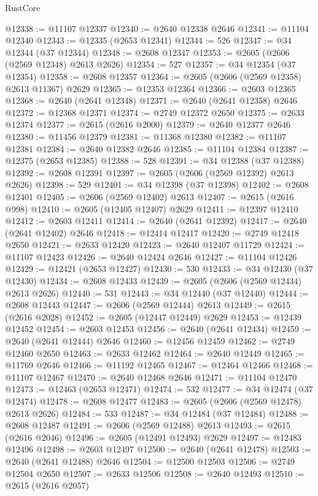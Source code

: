 \begin{lexlean}{RustCore}
\begin{coremodule}
@12338 := @11107 @12337
@12340 := @2640 @12338 @2646
@12341 := @11104 @12340
@12343 := @12335 (@2653 @12341)
@12344 := 526
@12347 := @34 @12344 (@37 @12344)
@12348 := @2608 @12347
@12353 := @2605 (@2606 (@2569 @12348) @2613 @2626)
@12354 := 527
@12357 := @34 @12354 (@37 @12354)
@12358 := @2608 @12357
@12364 := @2605 (@2606 (@2569 @12358) @2613 @11367) @2629
@12365 := @12353 @12364
@12366 := @2603 @12365
@12368 := @2640 (@2641 @12348)
@12371 := @2640 (@2641 @12358) @2646
@12372 := @12368 @12371
@12374 := @2749 @12372 @2650
@12375 := @2633 @12374
@12377 := @2615 (@2616 @2000)
@12379 := @2640 @12377 @2646
@12380 := @11456 @12379
@12381 := @11368 @12380
@12382 := @11107 @12381
@12384 := @2640 @12382 @2646
@12385 := @11104 @12384
@12387 := @12375 (@2653 @12385)
@12388 := 528
@12391 := @34 @12388 (@37 @12388)
@12392 := @2608 @12391
@12397 := @2605 (@2606 (@2569 @12392) @2613 @2626)
@12398 := 529
@12401 := @34 @12398 (@37 @12398)
@12402 := @2608 @12401
@12405 := @2606 (@2569 @12402) @2613
@12407 := @2615 (@2616 @998)
@12410 := @2605 (@12405 @12407) @2629
@12411 := @12397 @12410
@12412 := @2603 @12411
@12414 := @2640 (@2641 @12392)
@12417 := @2640 (@2641 @12402) @2646
@12418 := @12414 @12417
@12420 := @2749 @12418 @2650
@12421 := @2633 @12420
@12423 := @2640 @12407 @11729
@12424 := @11107 @12423
@12426 := @2640 @12424 @2646
@12427 := @11104 @12426
@12429 := @12421 (@2653 @12427)
@12430 := 530
@12433 := @34 @12430 (@37 @12430)
@12434 := @2608 @12433
@12439 := @2605 (@2606 (@2569 @12434) @2613 @2626)
@12440 := 531
@12443 := @34 @12440 (@37 @12440)
@12444 := @2608 @12443
@12447 := @2606 (@2569 @12444) @2613
@12449 := @2615 (@2616 @2028)
@12452 := @2605 (@12447 @12449) @2629
@12453 := @12439 @12452
@12454 := @2603 @12453
@12456 := @2640 (@2641 @12434)
@12459 := @2640 (@2641 @12444) @2646
@12460 := @12456 @12459
@12462 := @2749 @12460 @2650
@12463 := @2633 @12462
@12464 := @2640 @12449
@12465 := @11769 @2646
@12466 := @11192 @12465
@12467 := @12464 @12466
@12468 := @11107 @12467
@12470 := @2640 @12468 @2646
@12471 := @11104 @12470
@12473 := @12463 (@2653 @12471)
@12474 := 532
@12477 := @34 @12474 (@37 @12474)
@12478 := @2608 @12477
@12483 := @2605 (@2606 (@2569 @12478) @2613 @2626)
@12484 := 533
@12487 := @34 @12484 (@37 @12484)
@12488 := @2608 @12487
@12491 := @2606 (@2569 @12488) @2613
@12493 := @2615 (@2616 @2046)
@12496 := @2605 (@12491 @12493) @2629
@12497 := @12483 @12496
@12498 := @2603 @12497
@12500 := @2640 (@2641 @12478)
@12503 := @2640 (@2641 @12488) @2646
@12504 := @12500 @12503
@12506 := @2749 @12504 @2650
@12507 := @2633 @12506
@12508 := @2640 @12493
@12510 := @2615 (@2616 @2057)

\end{coremodule}
\end{lexlean}
